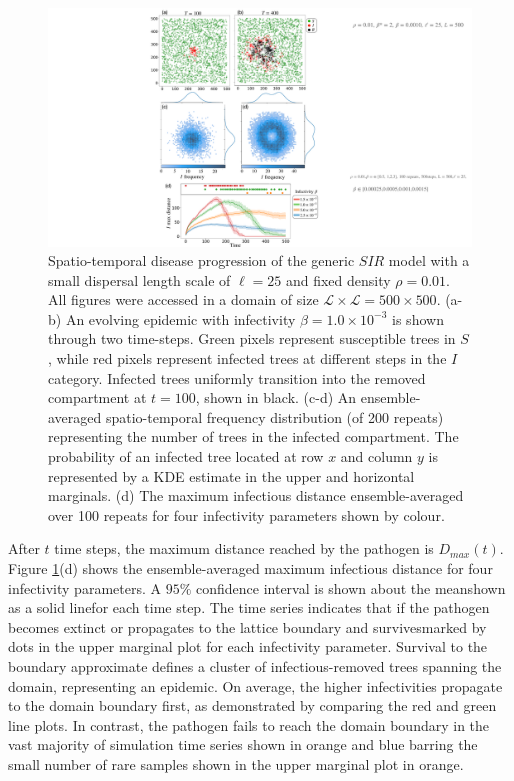 \begin{figure}
    \centering
    \includegraphics[scale=0.48]{chapter5/figures/fig1-sir-spatio-temporal.pdf}
    \caption{Spatio-temporal disease progression of the generic $SIR$ model with a small dispersal length scale of $\ell = 25$ and fixed density $\rho=0.01$. All figures were accessed in a domain of size $\mathcal{L} \times \mathcal{L} = 500 \times 500$. (a-b) An evolving epidemic with infectivity $\beta=1.0\times 10^{-3}$ is shown through two time-steps. Green pixels represent susceptible trees in $S$, while red pixels represent infected trees at different steps in the $I$ category. Infected trees uniformly transition into the removed compartment at $t=100$, shown in black. (c-d) An ensemble-averaged spatio-temporal frequency distribution (of 200 repeats) representing the number of trees in the infected compartment. The probability of an infected tree located at row $x$ and column $y$ is represented by a KDE estimate in the upper and horizontal marginals. (d) The maximum infectious distance ensemble-averaged over 100 repeats for four infectivity parameters shown by colour.}
\label{fig:sgm-evol}
\end{figure}

After $t$ time steps, the maximum distance reached by the pathogen is $D_{max}(t)$.
Figure \ref{fig:sgm-evol}(d) shows the ensemble-averaged maximum infectious distance for four infectivity parameters.
A $95\%$ confidence interval is shown about the mean\textemdash shown as a solid line\textemdash for each time step. 
The time series indicates that if the pathogen becomes extinct or propagates to the lattice boundary and survives\textemdash marked by dots in the upper marginal plot for each infectivity parameter.
Survival to the boundary approximate defines a cluster of infectious-removed trees spanning the domain, representing an epidemic.
On average, the higher infectivities propagate to the domain boundary first, as demonstrated by comparing the red and green line plots.
In contrast, the pathogen fails to reach the domain boundary in the vast majority of simulation time series shown in orange and blue
\textemdash barring the small number of rare samples shown in the upper marginal plot in orange.

